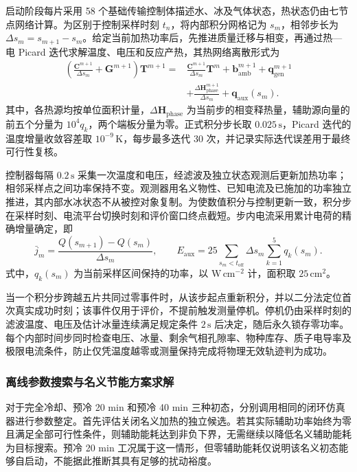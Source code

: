 \documentclass[bwprint]{gmcmthesis}
\numberwithin{equation}{section}
\numberwithin{figure}{section}
\begin{document}
启动阶段每片采用 58 个基础传输控制体描述水、冰及气体状态，热状态仍由七节点网络计算。为区别于控制采样时刻 \(t_n\)，将内部积分网格记为 \(s_m\)，相邻步长为 \(\Delta s_m=s_{m+1}-s_m\)。给定当前加热功率后，先推进质量迁移与相变，再通过热—电 Picard 迭代求解温度、电压和反应产热，其热网络离散形式为
\begin{equation}
\begin{aligned}
\left(\frac{\mathbf C^{m+1}}{\Delta s_m}+\mathbf G^{m+1}\right)
\boldsymbol{T}^{m+1}
={}&\frac{\mathbf C^{m+1}}{\Delta s_m}\boldsymbol{T}^{m}
+\boldsymbol b_{\mathrm{amb}}^{m+1}+\boldsymbol q_{\mathrm{gen}}^{m+1}\\
&+\frac{\Delta\boldsymbol H_{\mathrm{phase}}^{m+1}}{\Delta s_m}
+\boldsymbol q_{\mathrm{aux}}(s_m).
\end{aligned}
\label{eq:q4:solver_startup_be}
\end{equation}
其中，各热源均按单位面积计量，\(\Delta\boldsymbol H_{\mathrm{phase}}\) 为当前步的相变释热量，辅助源向量的前五个分量为 \(10^4q_k\)，两个端板分量为零。正式积分步长取 \(0.025\,\mathrm s\)，Picard 迭代的温度增量收敛容差取 \(10^{-9}\,\mathrm K\)，每步最多迭代 30 次，并记录实际迭代误差用于最终可行性复核。

控制器每隔 \(0.2\,\mathrm s\) 采集一次温度和电压，经滤波及独立状态观测后更新加热功率；相邻采样点之间功率保持不变。观测器用名义物性、已知电流及已施加的功率独立推进，其内部水冰状态不从被控对象复制。为使数值积分与控制更新一致，积分步在采样时刻、电流平台切换时刻和评价窗口终点截短。步内电流采用累计电荷的精确增量确定，即
\begin{equation}
\bar j_m=\frac{Q(s_{m+1})-Q(s_m)}{\Delta s_m},\qquad
E_{\mathrm{aux}}=25\sum_{s_m<t_{\mathrm{off}}}\Delta s_m\sum_{k=1}^{5}q_k(s_m).
\label{eq:q4:solver_charge_energy}
\end{equation}
式中，\(q_k(s_m)\) 为当前采样区间保持的功率，以 \(\mathrm{W\,cm^{-2}}\) 计，面积取 \(25\,\mathrm{cm^2}\)。

当一个积分步跨越五片共同过零事件时，从该步起点重新积分，并以二分法定位首次真实成功时刻；该事件仅用于评价，不提前触发测量停机。停机仍由采样时刻的滤波温度、电压及估计冰量连续满足规定条件 \(2\,\mathrm s\) 后决定，随后永久锁存零功率。每个内部时间步同时检查电压、冰量、剩余气相孔隙率、物种库存、质子电导率及极限电流条件，防止仅凭温度越零或测量保持完成将物理无效轨迹判为成功。

\subsubsection{离线参数搜索与名义节能方案求解}
对于完全冷却、预冷 20 min 和预冷 40 min 三种初态，分别调用相同的闭环仿真器进行参数整定。首先评估关闭名义加热的独立候选。若其实际辅助功率始终为零且满足全部可行性条件，则辅助能耗达到非负下界，无需继续以降低名义辅助能耗为目标搜索。预冷 20 min 工况属于这一情形，但零辅助能耗仅说明该名义初态能够自启动，不能据此推断其具有足够的扰动裕度。
\end{document}
